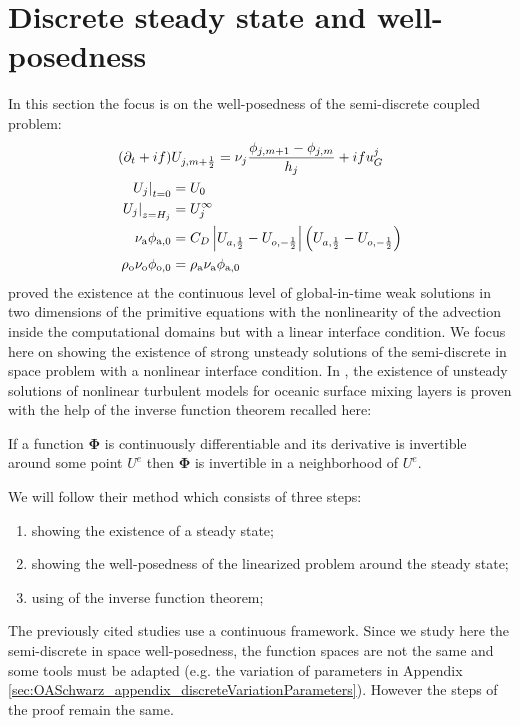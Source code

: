 \section{Discrete steady state and well-posedness}
\label{sec:OASchwarz_DiscreteStationaryState}
In this section the focus is on the well-posedness of
the semi-discrete coupled problem:
\begin{subequations}
\label{eq:OASchwarz_SemiDiscreteCoupledProblem}
\begin{align}
(\partial_t + if) &U_{j, m+\frac{1}{2}} = \nu_j
	\frac{\phi_{j,m+1} - \phi_{j,m}}{h_j} + if u_G^j
\\
	\left.U_j\right|_{t=0} &= U_0\\
	\left.U_j\right|_{z=H_j} &= U_j^\infty\\
	\nu_{\rm a}\phi_{{\rm a}, 0} &=  C_D
\left|
	{U}_{a, \frac{1}{2}}
-
	{U}_{o, -\frac{1}{2}}
\right|
\left(
	{U}_{a, \frac{1}{2}}
-
	{U}_{o, -\frac{1}{2}}
\right)
\label{eq:bulkInterfaceConditionSemiDiscrete}\\
	\rho_{\rm o} \nu_{\rm o}\phi_{{\rm o}, 0} &= \rho_{\rm a}
	\nu_{\rm a}\phi_{{\rm a}, 0}
\label{eq:fluxInterfaceConditionSemiDiscrete}
\end{align}
\end{subequations}
\cite{lions_mathematical_1995} proved the existence at the
continuous level
of global-in-time weak solutions in
two dimensions of the primitive equations with
the nonlinearity of the advection inside the
computational domains but with a linear
interface condition.
We focus here on showing the existence of strong
unsteady solutions of the semi-discrete in space
problem with a nonlinear interface condition.
In \citep{chacon-rebollo_existence_2014},
the existence of unsteady solutions of
nonlinear turbulent models for oceanic surface mixing layers is
proven with the help of the inverse function theorem recalled here:
\begin{invFuncTheorem}
	If a function $\mathbf{\Phi}$
	is continuously differentiable and
	its derivative is invertible around some point $U^e$
	then $\mathbf{\Phi}$ is invertible in a neighborhood of $U^e$.
\end{invFuncTheorem}
\par
We will follow their method which consists of three steps:
\begin{enumerate}
	\item showing the existence of a steady state;
	\item showing the well-posedness of the linearized problem
	around the steady state;
	\item using of the inverse function theorem;
\end{enumerate}
The previously cited studies use a continuous framework.
Since we study here the semi-discrete in space well-posedness,
the function spaces are not the same and some tools must be adapted
(e.g. the variation of parameters in Appendix
\ref{sec:OASchwarz_appendix_discreteVariationParameters}).
However the steps of the proof remain the same.
